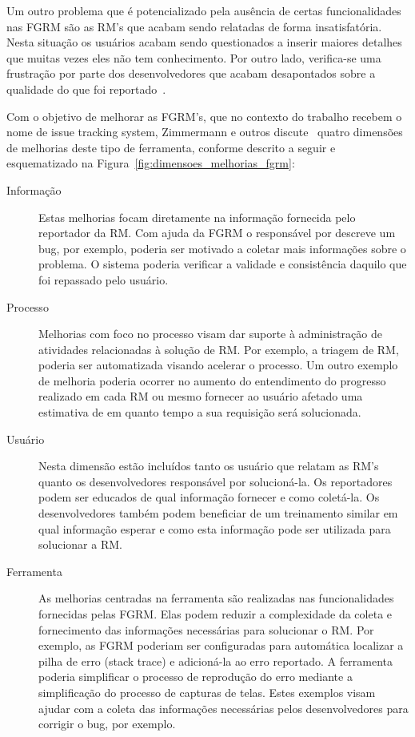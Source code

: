 Um outro problema que é potencializado pela ausência de certas funcionalidades
nas FGRM são as RM's que acabam sendo relatadas de forma insatisfatória. Nesta
situação os usuários acabam sendo questionados a inserir maiores detalhes que
muitas vezes eles não tem conhecimento. Por outro lado, verifica-se uma
frustração por parte dos desenvolvedores que acabam desapontados sobre a
qualidade do que foi reportado~\cite{just2008towards}.

Com o objetivo de melhorar as FGRM's, que no contexto do trabalho recebem o nome
de issue tracking system, Zimmermann e outros
discute~\cite{zimmermann2009improving} quatro dimensões de melhorias deste tipo
de ferramenta, conforme descrito a seguir e esquematizado na
Figura~\ref{fig:dimensoes_melhorias_fgrm}:

\begin{description}
	\item[Informação] Estas melhorias focam diretamente na informação fornecida
		pelo reportador da RM\@. Com ajuda da FGRM o responsável por descreve um
		bug, por exemplo, poderia ser motivado a coletar mais informações sobre o
		problema. O sistema poderia verificar a validade e consistência daquilo
		que foi repassado pelo usuário.
   \item[Processo] Melhorias com foco no processo visam dar suporte à
	   administração de atividades relacionadas à solução de RM\@. Por exemplo,
	   a triagem de RM, poderia ser automatizada visando acelerar o processo. Um
	   outro exemplo de melhoria poderia ocorrer no aumento do entendimento do
	   progresso realizado em cada RM ou mesmo fornecer ao usuário afetado uma
	   estimativa de em quanto tempo a sua requisição será solucionada.
	\item[Usuário] Nesta dimensão estão incluídos tanto os usuário que relatam
		as RM's quanto os desenvolvedores responsável por solucioná-la. Os
		reportadores podem ser educados de qual informação fornecer e como
		coletá-la. Os desenvolvedores também podem beneficiar de um treinamento
		similar em qual informação esperar e como esta informação pode ser
		utilizada para solucionar a RM\@.
	\item[Ferramenta] As melhorias centradas na ferramenta são realizadas nas
		funcionalidades fornecidas pelas FGRM\@. Elas podem reduzir a
		complexidade da coleta e fornecimento das informações necessárias para
		solucionar o RM\@. Por exemplo, as FGRM poderiam ser configuradas para
		automática localizar a pilha de erro (stack trace) e adicioná-la ao erro
		reportado.  A ferramenta poderia simplificar o processo de reprodução do
		erro mediante a simplificação do processo de capturas de telas. Estes
		exemplos visam ajudar com a coleta das informações necessárias pelos
		desenvolvedores para corrigir o bug, por exemplo.
\end{description}

